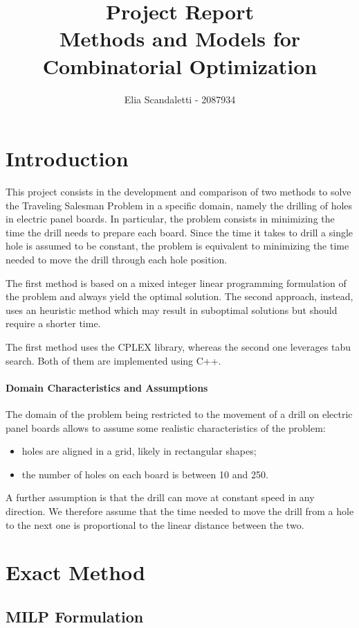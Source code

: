 \documentclass{article}
\title{
    Project Report
    \\ \Large
    Methods and Models for Combinatorial Optimization 
    }
\author{Elia Scandaletti - 2087934}
\begin{document}
\maketitle

\section{Introduction}

This project consists in the development and comparison of two methods to solve the Traveling Salesman Problem in a specific domain, namely the drilling of holes in electric panel boards.
In particular, the problem consists in minimizing the time the drill needs to prepare each board.
Since the time it takes to drill a single hole is assumed to be constant, the problem is equivalent to minimizing the time needed to move the drill through each hole position.

The first method is based on a mixed integer linear programming formulation of the problem and always yield the optimal solution.
The second approach, instead, uses an heuristic method which may result in suboptimal solutions but should require a shorter time.

The first method uses the CPLEX library, whereas the second one leverages tabu search.
Both of them are implemented using C++.

\paragraph{Domain Characteristics and Assumptions}
The domain of the problem being restricted to the movement of a drill on electric panel boards allows to assume some realistic characteristics of the problem:
\begin{itemize}
    \item holes are aligned in a grid, likely in rectangular shapes;
    \item the number of holes on each board is between 10 and 250.
\end{itemize}
A further assumption is that the drill can move at constant speed in any direction.
We therefore assume that the time needed to move the drill from a hole to the next one is proportional to the linear distance between the two.

\section{Exact Method}

\subsection{MILP Formulation}
\end{document}
